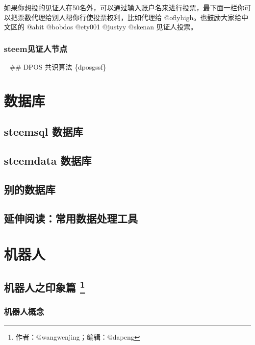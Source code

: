 \documentclass[]{ctexbook}
\begin{document}
如果你想投的见证人在50名外，可以通过输入账户名来进行投票，最下面一栏你可以把票数代理给别人帮你行使投票权利，比如代理给 @oflyhigh。也鼓励大家给中文区的 @abit @bobdos @ety001 @justyy @skenan 见证人投票。

\hypertarget{steem_witness_node}{%
\subsection{steem见证人节点}\label{steem_witness_node}}

~
\#\# DPOS 共识算法 \{dposgssf\}

\hypertarget{sjclp}{%
\chapter{数据库}\label{sjclp}}

\hypertarget{steemsql_sjk}{%
\section{steemsql 数据库}\label{steemsql_sjk}}

\hypertarget{steemdata_sjk}{%
\section{steemdata 数据库}\label{steemdata_sjk}}

\hypertarget{bdsjk}{%
\section{别的数据库}\label{bdsjk}}

\hypertarget{ysyd_cysjclgj}{%
\section{延伸阅读：常用数据处理工具}\label{ysyd_cysjclgj}}

\hypertarget{jqrp}{%
\chapter{机器人}\label{jqrp}}

\hypertarget{jqrzyxp}{%
\section[机器人之印象篇 ]{\texorpdfstring{机器人之印象篇 \footnote{作者：@wangwenjing；编辑：@dapeng}}{机器人之印象篇 }}\label{jqrzyxp}}

\hypertarget{jqrgn}{%
\subsection{机器人概念}\label{jqrgn}}
\end{document}
